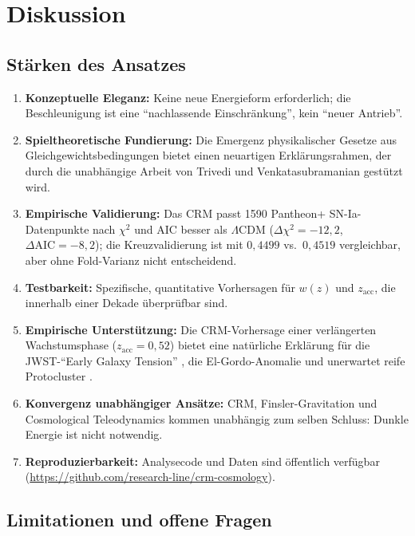 \documentclass[aps,prd,twocolumn,superscriptaddress,nofootinbib]{revtex4-2}
\begin{document}
\section{Diskussion}
\label{sec:discussion}

\subsection{Stärken des Ansatzes}

\begin{enumerate}
\item \textbf{Konzeptuelle Eleganz:} Keine neue Energieform erforderlich; die Beschleunigung ist eine ``nachlassende Einschränkung'', kein ``neuer Antrieb''.
\item \textbf{Spieltheoretische Fundierung:} Die Emergenz physikalischer Gesetze aus Gleichgewichtsbedingungen bietet einen neuartigen Erklärungsrahmen, der durch die unabhängige Arbeit von Trivedi und Venkatasubramanian \cite{Trivedi2025} gestützt wird.
\item \textbf{Empirische Validierung:} Das CRM passt 1590 Pantheon+ SN-Ia-Datenpunkte nach $\chi^2$ und AIC besser als $\Lambda$CDM ($\Delta\chi^2 = -12{,}2$, $\Delta\mathrm{AIC} = -8{,}2$); die Kreuzvalidierung ist mit $0{,}4499$ vs.\ $0{,}4519$ vergleichbar, aber ohne Fold-Varianz nicht entscheidend.
\item \textbf{Testbarkeit:} Spezifische, quantitative Vorhersagen für $w(z)$ und $z_{\mathrm{acc}}$, die innerhalb einer Dekade überprüfbar sind.
\item \textbf{Empirische Unterstützung:} Die CRM-Vorhersage einer verlängerten Wachstumsphase ($z_{\mathrm{acc}} = 0{,}52$) bietet eine natürliche Erklärung für die JWST-``Early Galaxy Tension'' \cite{Labbe2023, BoylanKolchin2023}, die El-Gordo-Anomalie \cite{Asencio2023} und unerwartet reife Protocluster \cite{Miller2018}.
\item \textbf{Konvergenz unabhängiger Ansätze:} CRM, Finsler-Gravitation und Cosmological Teleodynamics kommen unabhängig zum selben Schluss: Dunkle Energie ist nicht notwendig.
\item \textbf{Reproduzierbarkeit:} Analysecode und Daten sind öffentlich verfügbar (\url{https://github.com/research-line/crm-cosmology}).
\end{enumerate}

\subsection{Limitationen und offene Fragen}
\end{document}
